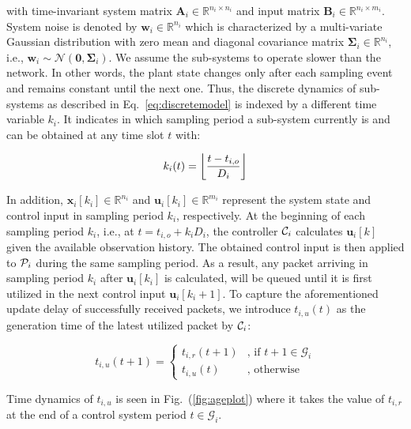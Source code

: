 with time-invariant system matrix $\boldsymbol{A}_i \in \mathbb{R}^{n_i\times
n_i}$ and input matrix $\boldsymbol{B}_i \in \mathbb{R}^{n_i\times m_i}$. System
noise is denoted by $\boldsymbol{w}_i \in \mathbb{R}^{n_i}$ which is
characterized by a multi-variate Gaussian distribution with zero mean and
diagonal covariance matrix $\mathbf{\Sigma}_i \in \mathbb{R}^{n_i}$, i.e.,
$\boldsymbol{w}_i \sim \mathcal{N}(\mathbf{0}, \mathbf{\Sigma}_i)$. We assume
the sub-systems to operate slower than the network. In other words, the plant
state changes only after each sampling event and remains constant until the next
one. Thus, the discrete dynamics of sub-systems as described in
Eq.~\eqref{eq:discretemodel} is indexed by a different time variable $k_i$. It
indicates in which sampling period a sub-system currently is and can be obtained
at any time slot $t$ with:

\begin{equation}
  \label{eq:k_map}
	k_i(t) = \left\lfloor \frac{t - t_{i,o}}{D_i} \right\rfloor
\end{equation}

In addition, $\boldsymbol{x}_i[k_i] \in \mathbb{R}^{n_i}$ and
$\boldsymbol{u}_i[k_i] \in \mathbb{R}^{m_i}$ represent the system state and
control input in sampling period $k_i$, respectively. At the beginning of each
sampling period $k_i$, i.e., at $t=t_{i,o}+k_iD_i$, the controller $\mathcal{C}_i$
calculates $\boldsymbol{u}_i[k]$ given the available observation history. The
obtained control input is then applied to $\mathcal{P}_i$ during the same sampling
period. As a result, any packet arriving in sampling period $k_i$ after
$\boldsymbol{u}_i[k_i]$ is calculated, will be queued until it is first utilized
in the next control input $\boldsymbol{u}_i[k_i+1]$. To capture the
aforementioned update delay of successfully received packets, we introduce
$t_{i,u}(t)$ as the generation time of the latest utilized packet by
$\mathcal{C}_i$:

\begin{equation}
  \label{eq:t_u}
  t_{i, u}(t+1) =
  \begin{cases}
  t_{i, r}(t+1) & \text{, if } t+1 \in \mathcal{G}_i \\ 
  t_{i, u}(t) & \text{, otherwise}	
  \end{cases} 
\end{equation}

Time dynamics of $t_{i,u}$ is seen in Fig.~(\ref{fig:ageplot}) where it takes
the value of $t_{i,r}$ at the end of a control system period $t \in
\mathcal{G}_i$.

